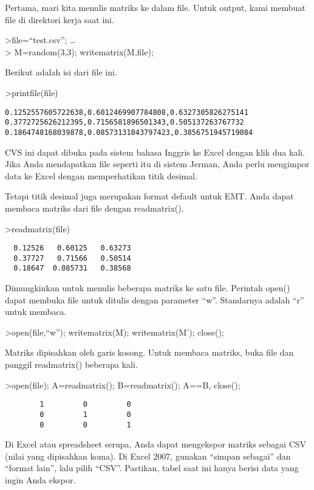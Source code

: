 \documentclass[
]{book}
\begin{document}
Pertama, mari kita menulis matriks ke dalam file. Untuk output, kami membuat file di direktori kerja saat ini.

\textgreater file=``test.csv''; \ldots{}\\
\textgreater{} M=random(3,3); writematrix(M,file);

Berikut adalah isi dari file ini.

\textgreater printfile(file)

\begin{verbatim}
0.1252557605722638,0.6012469907784808,0.6327305826275141
0.3772725626212395,0.7156581896501343,0.505137263767732
0.1864748168039878,0.08573131043797423,0.3856751945719084
\end{verbatim}

CVS ini dapat dibuka pada sistem bahasa Inggris ke Excel dengan klik dua kali. Jika Anda mendapatkan file seperti itu di sistem Jerman, Anda perlu mengimpor data ke Excel dengan memperhatikan titik desimal.

Tetapi titik desimal juga merupakan format default untuk EMT. Anda dapat membaca matriks dari file dengan readmatrix().

\textgreater readmatrix(file)

\begin{verbatim}
  0.12526   0.60125   0.63273 
  0.37727   0.71566   0.50514 
  0.18647  0.085731   0.38568 
\end{verbatim}

Dimungkinkan untuk menulis beberapa matriks ke satu file. Perintah open() dapat membuka file untuk ditulis dengan parameter ``w''. Standarnya adalah ``r'' untuk membaca.

\textgreater open(file,``w''); writematrix(M); writematrix(M'); close();

Matriks dipisahkan oleh garis kosong. Untuk membaca matriks, buka file dan panggil readmatrix() beberapa kali.

\textgreater open(file); A=readmatrix(); B=readmatrix(); A==B, close();

\begin{verbatim}
        1         0         0 
        0         1         0 
        0         0         1 
\end{verbatim}

Di Excel atau spreadsheet serupa, Anda dapat mengekspor matriks sebagai CSV (nilai yang dipisahkan koma). Di Excel 2007, gunakan ``simpan sebagai'' dan ``format lain'', lalu pilih ``CSV''. Pastikan, tabel saat ini hanya berisi data yang ingin Anda ekspor.
\end{document}
